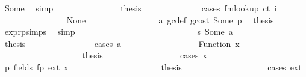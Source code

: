 \begin{isabellebody}
\ Some\ \isamarkupfalse%
\ simp\isanewline
\ \ \ \ \ \ \ \ \ \ \ \ \isamarkupfalse%
\ \isamarkupfalse%
\ {\isacharquery}{\kern0pt}thesis\isanewline
\ \ \ \ \ \ \ \ \ \ \ \ \isamarkupfalse%
\ {\isacharparenleft}{\kern0pt}cases\ {\isachardoublequoteopen}fmlookup\ ct\ i{\isachardoublequoteclose}{\isacharparenright}{\kern0pt}\isanewline
\ \ \ \ \ \ \ \ \ \ \ \ \ \ \isamarkupfalse%
\ None\isanewline
\ \ \ \ \ \ \ \ \ \ \ \ \ \ \isamarkupfalse%
\ {}{}{\isacharparenleft}{\kern0pt}{}{\isacharparenright}{\kern0pt}\ a{}\ gc{\isacharunderscore}{\kern0pt}def\ gcost\ Some\ p{}\ \isamarkupfalse%
\ {\isacharquery}{\kern0pt}thesis\ \isamarkupfalse%
\ expr{\isachardot}{\kern0pt}psimps{\isacharparenleft}{\kern0pt}{}{}{\isacharparenright}{\kern0pt}\ \isamarkupfalse%
\ simp\isanewline
\ \ \ \ \ \ \ \ \ \ \ \ \isamarkupfalse%
\isanewline
\ \ \ \ \ \ \ \ \ \ \ \ \ \ \isamarkupfalse%
\ s{}{\isacharcolon}{\kern0pt}\ {\isacharparenleft}{\kern0pt}Some\ a{\isacharparenright}{\kern0pt}\isanewline
\ \ \ \ \ \ \ \ \ \ \ \ \ \ \isamarkupfalse%
\ \isamarkupfalse%
\ {\isacharquery}{\kern0pt}thesis\isanewline
\ \ \ \ \ \ \ \ \ \ \ \ \ \ \isamarkupfalse%
\ {\isacharparenleft}{\kern0pt}cases\ a{\isacharparenright}{\kern0pt}\isanewline
\ \ \ \ \ \ \ \ \ \ \ \ \ \ \ \ \isamarkupfalse%
\ {\isacharparenleft}{\kern0pt}Function\ x{}{\isacharparenright}{\kern0pt}\isanewline
\ \ \ \ \ \ \ \ \ \ \ \ \ \ \ \ \isamarkupfalse%
\ \isamarkupfalse%
\ {\isacharquery}{\kern0pt}thesis\isanewline
\ \ \ \ \ \ \ \ \ \ \ \ \ \ \ \ \isamarkupfalse%
\ {\isacharparenleft}{\kern0pt}cases\ x{}{\isacharparenright}{\kern0pt}\isanewline
\ \ \ \ \ \ \ \ \ \ \ \ \ \ \ \ \ \ \isamarkupfalse%
\ p{}{\isacharcolon}{\kern0pt}\ {\isacharparenleft}{\kern0pt}fields\ fp\ ext\ x{\isacharparenright}{\kern0pt}\isanewline
\ \ \ \ \ \ \ \ \ \ \ \ \ \ \ \ \ \ \isamarkupfalse%
\ \isamarkupfalse%
\ {\isacharquery}{\kern0pt}thesis\isanewline
\ \ \ \ \ \ \ \ \ \ \ \ \ \ \ \ \ \ \isamarkupfalse%
\ {\isacharparenleft}{\kern0pt}cases\ ext{\isacharparenright}{\kern0pt}\isanewline
\ \ \ \ \ \ \ \ \ \ \ \ \ \ \ \ \ \ \ \ \isamarkupfalse%

\end{isabellebody}
